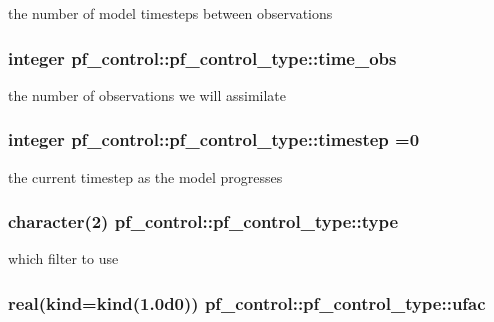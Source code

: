 the number of model timesteps between observations 

\hypertarget{structpf__control_1_1pf__control__type_a7199be1c1a99f9f066af0ee214f51824}{
\subsubsection[{time\-\_\-obs}]{\setlength{\rightskip}{0pt plus 5cm}integer pf\-\_\-control\-::pf\-\_\-control\-\_\-type\-::time\-\_\-obs}}\label{structpf__control_1_1pf__control__type_a7199be1c1a99f9f066af0ee214f51824}


the number of observations we will assimilate 

\hypertarget{structpf__control_1_1pf__control__type_a12beb826016805c71fcc112a733f2330}{
\subsubsection[{timestep}]{\setlength{\rightskip}{0pt plus 5cm}integer pf\-\_\-control\-::pf\-\_\-control\-\_\-type\-::timestep =0}}\label{structpf__control_1_1pf__control__type_a12beb826016805c71fcc112a733f2330}


the current timestep as the model progresses 

\hypertarget{structpf__control_1_1pf__control__type_ab21afb0aa9c7933073356dbc2155870c}{
\subsubsection[{type}]{\setlength{\rightskip}{0pt plus 5cm}character(2) pf\-\_\-control\-::pf\-\_\-control\-\_\-type\-::type}}\label{structpf__control_1_1pf__control__type_ab21afb0aa9c7933073356dbc2155870c}


which filter to use 

\hypertarget{structpf__control_1_1pf__control__type_a41d48f1ac4e0d69dcea1cd99a62fca90}{
\subsubsection[{ufac}]{\setlength{\rightskip}{0pt plus 5cm}real(kind=kind(1.\-0d0)) pf\-\_\-control\-::pf\-\_\-control\-\_\-type\-::ufac}}\label{structpf__control_1_1pf__control__type_a41d48f1ac4e0d69dcea1cd99a62fca90}



